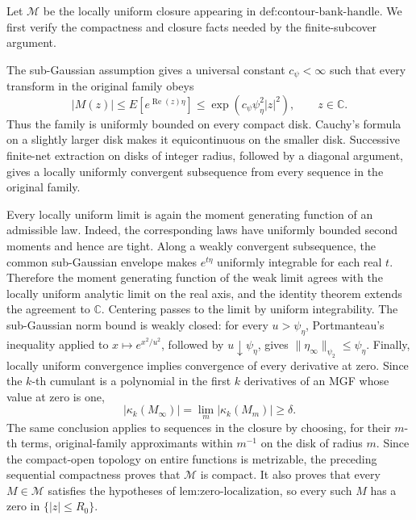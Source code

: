 Let \(\mathscr M\) be the locally uniform closure appearing in \(\text{def:contour-bank-handle}\).  We first verify the compactness and closure facts needed by the finite-subcover argument.

The sub-Gaussian assumption gives a universal constant \(c_{\psi}<\infty\) such that every transform in the original family obeys
\[
 |M(z)|
 \le E[e^{\operatorname{Re}(z)\eta}]
 \le \exp(c_{\psi}\psi_{\eta}^{2}|z|^{2}),
 \qquad z\in\mathbb C.
\]
Thus the family is uniformly bounded on every compact disk.  Cauchy's formula on a slightly larger disk makes it equicontinuous on the smaller disk.  Successive finite-net extraction on disks of integer radius, followed by a diagonal argument, gives a locally uniformly convergent subsequence from every sequence in the original family.

Every locally uniform limit is again the moment generating function of an admissible law.  Indeed, the corresponding laws have uniformly bounded second moments and hence are tight.  Along a weakly convergent subsequence, the common sub-Gaussian envelope makes \(e^{t\eta}\) uniformly integrable for each real \(t\).  Therefore the moment generating function of the weak limit agrees with the locally uniform analytic limit on the real axis, and the identity theorem extends the agreement to \(\mathbb C\).  Centering passes to the limit by uniform integrability.  The sub-Gaussian norm bound is weakly closed: for every \(u>\psi_{\eta}\), Portmanteau's inequality applied to \(x\mapsto e^{x^{2}/u^{2}}\), followed by \(u\downarrow\psi_{\eta}\), gives \(\|\eta_{\infty}\|_{\psi_2}\le\psi_{\eta}\).  Finally, locally uniform convergence implies convergence of every derivative at zero.  Since the \(k\)-th cumulant is a polynomial in the first \(k\) derivatives of an MGF whose value at zero is one,
\[
 |\kappa_k(M_{\infty})|
 =\lim_m|\kappa_k(M_m)|
 \ge\delta.
\]
The same conclusion applies to sequences in the closure by choosing, for their \(m\)-th terms, original-family approximants within \(m^{-1}\) on the disk of radius \(m\).  Since the compact-open topology on entire functions is metrizable, the preceding sequential compactness proves that \(\mathscr M\) is compact.  It also proves that every \(M\in\mathscr M\) satisfies the hypotheses of \(\text{lem:zero-localization}\), so every such \(M\) has a zero in \(\{|z|\le R_0\}\).

